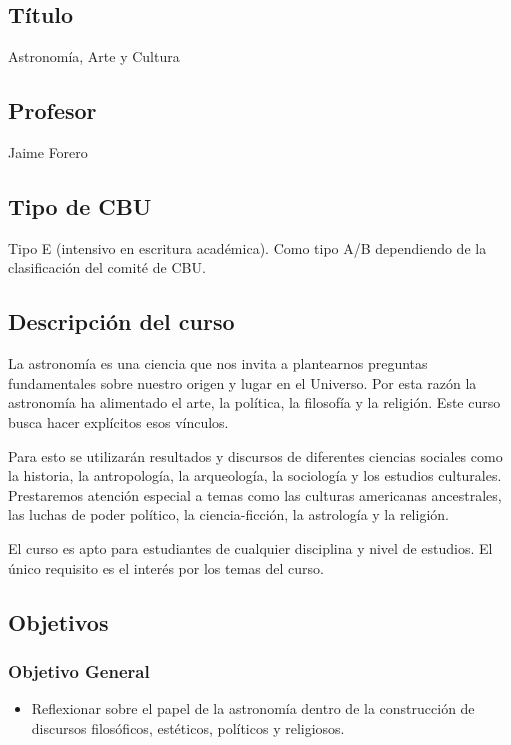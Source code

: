 \documentclass[12pt]{report}
\begin{document}
\subsection*{\bf T\'itulo}
Astronom\'ia, Arte y Cultura\\

\subsection*{\bf Profesor}
Jaime Forero\\

\subsection*{Tipo de CBU}
Tipo E (intensivo en escritura acad\'emica). 
Como tipo A/B dependiendo de la clasificaci\'on del comit\'e de CBU.  

\subsection*{Descripci\'on del curso}
La astronom\'ia es una ciencia que nos invita a plantearnos preguntas
fundamentales sobre nuestro origen y lugar en el Universo. 
Por esta raz\'on la astronom\'ia ha alimentado el
arte, la pol\'itica, la filosof\'ia y la religi\'on. Este curso busca
hacer expl\'icitos esos v\'inculos.

Para esto se utilizar\'an resultados y discursos de diferentes
ciencias sociales como la historia, la antropolog\'ia, la arqueolog\'ia, la
sociolog\'ia y los estudios culturales. Prestaremos atenci\'on
especial a temas como las culturas americanas  ancestrales, las luchas
de poder pol\'itico, la ciencia-ficci\'on, la astrolog\'ia y la
religi\'on.  

El curso es apto para estudiantes de cualquier disciplina y nivel de
estudios. El \'unico requisito es el inter\'es por los temas del curso.  
\subsection*{Objetivos}

\subsubsection*{Objetivo General}
\begin{itemize}
\item Reflexionar sobre el papel de la astronom\'ia dentro de la
  construcci\'on de discursos filos\'oficos,
  est\'eticos, pol\'iticos y religiosos. 
\end{itemize}
\end{document}
